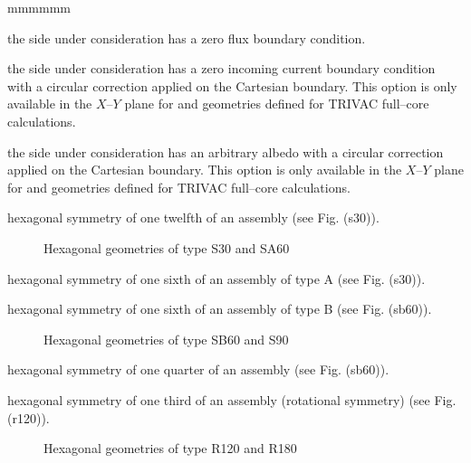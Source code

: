 \begin{ListeDeDescription}{mmmmmm}
\item[\moc{ZERO}] the side under consideration has a zero flux boundary condition. 

\item[\moc{CYLI}] the side under consideration has a zero incoming current boundary condition with a circular correction applied on the Cartesian boundary. This option is only available in
the $X$--$Y$ plane for  and  geometries defined for TRIVAC full--core calculations.

\item[\moc{ACYL}] the side under consideration has an arbitrary albedo with a circular correction applied on the Cartesian boundary. This option is only available in
the $X$--$Y$ plane for  and  geometries defined for TRIVAC full--core calculations.

\item[\moc{S30}] hexagonal symmetry of one twelfth of an assembly (see Fig. \fig(s30)).

\begin{figure}[htbp]
\begin{center} 
\epsfxsize=10cm
\centerline{ }
\parbox{14cm}{\caption{Hexagonal geometries of type S30 and
SA60}\label{fig:s30}}  \end{center} 
\end{figure}

\item[\moc{SA60}] hexagonal symmetry of one sixth of an assembly of type A (see Fig. \fig(s30)).

\item[\moc{SB60}] hexagonal symmetry of one sixth of an assembly of 
type B (see Fig. \fig(sb60)).

\begin{figure}[htbp] 
\begin{center} 
\epsfxsize=12cm
\centerline{ }
\parbox{14cm}{\caption{Hexagonal geometries of type SB60 and
S90}\label{fig:sb60}}  \end{center} 
\end{figure}

\item[\moc{S90}] hexagonal symmetry of one quarter of an assembly (see Fig. \fig(sb60)).

\item[\moc{R120}] hexagonal symmetry of one third of an assembly (rotational symmetry) (see Fig. \fig(r120)).

\begin{figure}[htbp] 
\begin{center} 
\epsfxsize=10cm
\centerline{ }
\parbox{14cm}{\caption{Hexagonal geometries of type R120 and
R180}\label{fig:r120}}  \end{center} 
\end{figure}


\end{ListeDeDescription}
